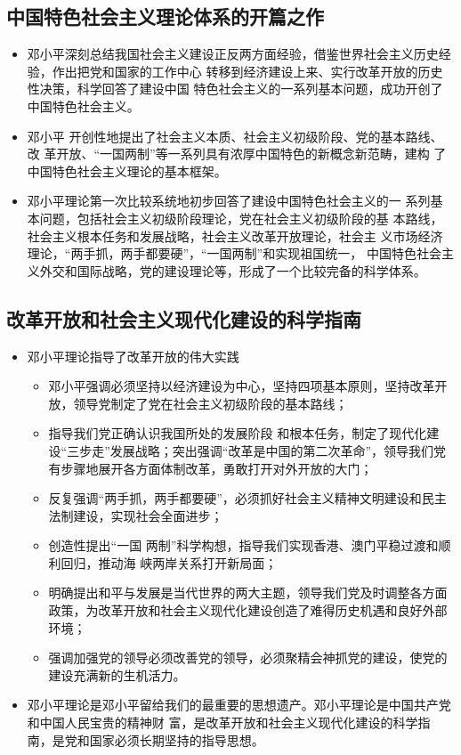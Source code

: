 \documentclass[12pt,openany]{ctexbook}
\begin{document}
\subsection{中国特色社会主义理论体系的开篇之作}
\begin{itemize}
  \item 邓小平深刻总结我国社会主义建设正反两方面经验，借鉴世界社会主义历史经验，作出把党和国家的工作中心 转移到经济建设上来、实行改革开放的历史性决策，科学回答了建设中国 特色社会主义的一系列基本问题，成功开创了中国特色社会主义。
  \item 邓小平 开创性地提出了社会主义本质、社会主义初级阶段、党的基本路线、改 革开放、“一国两制”等一系列具有浓厚中国特色的新概念新范畴，建构 了中国特色社会主义理论的基本框架。
  \item 邓小平理论第一次比较系统地初步回答了建设中国特色社会主义的一 系列基本问题，包括社会主义初级阶段理论，党在社会主义初级阶段的基 本路线，社会主义根本任务和发展战略，社会主义改革开放理论，社会主 义市场经济理论，“两手抓，两手都要硬”，“一国两制”和实现祖国统一， 中国特色社会主义外交和国际战略，党的建设理论等，形成了一个比较完备的科学体系。
\end{itemize}
\subsection{改革开放和社会主义现代化建设的科学指南}
\begin{itemize}
  \item 邓小平理论指导了改革开放的伟大实践
\begin{itemize}
  \item 邓小平强调必须坚持以经济建设为中心，坚持四项基本原则，坚持改革开放，领导党制定了党在社会主义初级阶段的基本路线；
  \item 指导我们党正确认识我国所处的发展阶段 和根本任务，制定了现代化建设“三步走”发展战略；突出强调“改革是中国的第二次革命”，领导我们党有步骤地展开各方面体制改革，勇敢打开对外开放的大门；
  \item 反复强调“两手抓，两手都要硬”，必须抓好社会主义精神文明建设和民主法制建设，实现社会全面进步；
  \item 创造性提出“一国 两制”科学构想，指导我们实现香港、澳门平稳过渡和顺利回归，推动海 峡两岸关系打开新局面；
  \item 明确提出和平与发展是当代世界的两大主题，领导我们党及时调整各方面政策，为改革开放和社会主义现代化建设创造了难得历史机遇和良好外部环境；
  \item 强调加强党的领导必须改善党的领导，必须聚精会神抓党的建设，使党的建设充满新的生机活力。
\end{itemize}
  \item 邓小平理论是邓小平留给我们的最重要的思想遗产。邓小平理论是中国共产党和中国人民宝贵的精神财 富，是改革开放和社会主义现代化建设的科学指南，是党和国家必须长期坚持的指导思想。
\end{itemize}
\end{document}
